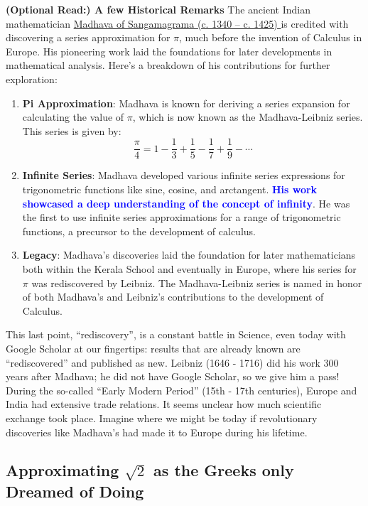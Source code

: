 \textbf{(Optional Read:) A few Historical Remarks} The ancient Indian mathematician \href{https://en.wikipedia.org/wiki/Madhava_of_Sangamagrama}{Madhava of Sangamagrama (c. 1340 – c. 1425) }is credited with discovering a series approximation for \(\pi\), much before the invention of Calculus in Europe. His pioneering work laid the foundations for later developments in mathematical analysis. Here's a breakdown of his contributions for further exploration:

\begin{enumerate}
    \item \textbf{Pi Approximation}: Madhava is known for deriving a series expansion for calculating the value of \(\pi\), which is now known as the Madhava-Leibniz series. This series is given by:
    \[
    \frac{\pi}{4} = 1 - \frac{1}{3} + \frac{1}{5} - \frac{1}{7} + \frac{1}{9} - \cdots
    \]

    \item \textbf{Infinite Series}: Madhava developed various infinite series expressions for trigonometric functions like sine, cosine, and arctangent. \textcolor{blue}{\bf His work showcased a deep understanding of the concept of infinity}. He was the first to use infinite series approximations for a range of trigonometric functions, a precursor to the development of calculus.

    \item \textbf{Legacy}: Madhava's discoveries laid the foundation for later mathematicians both within the Kerala School and eventually in Europe, where his series for \(\pi\) was rediscovered by Leibniz. The Madhava-Leibniz series is named in honor of both Madhava's and Leibniz’s contributions to the development of Calculus.

\end{enumerate}

This last point, ``rediscovery'', is a constant battle in Science, even today with Google Scholar at our fingertips: results that are already known are ``rediscovered'' and published as new. Leibniz (1646 - 1716) did his work 300 years after Madhava; he did not have Google Scholar, so we give him a pass! During the so-called ``Early Modern Period'' (15th - 17th centuries), Europe and India had extensive trade relations. It seems unclear how much scientific exchange took place. Imagine where we might be today if revolutionary discoveries like Madhava's had made it to Europe during his lifetime. 



\subsection{Approximating \texorpdfstring{$\sqrt{2}$}{sqrt{2}} as the Greeks only Dreamed of Doing}
\label{sec:ApproximatingSquareRoot2}


